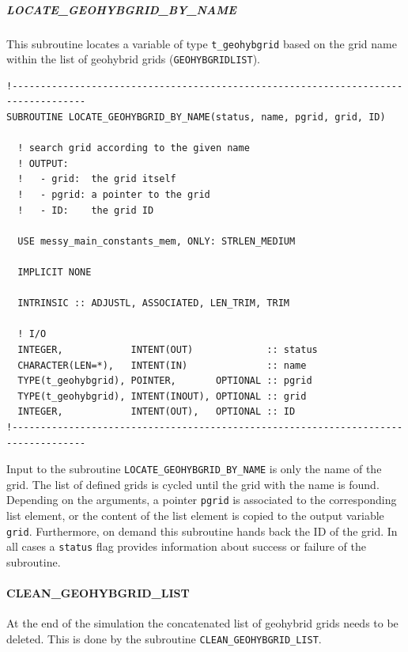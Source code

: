 \documentclass[11pt,twoside]{article}
\begin{document}
\subparagraph{LOCATE\_GEOHYBGRID\_BY\_NAME\\}
This subroutine locates a variable of type \verb|t_geohybgrid| based
on the grid name within
the list of geohybrid grids (\verb|GEOHYBGRIDLIST|).
\begin{verbatim}
!-----------------------------------------------------------------------------------
SUBROUTINE LOCATE_GEOHYBGRID_BY_NAME(status, name, pgrid, grid, ID)

  ! search grid according to the given name
  ! OUTPUT: 
  !   - grid:  the grid itself
  !   - pgrid: a pointer to the grid
  !   - ID:    the grid ID 

  USE messy_main_constants_mem, ONLY: STRLEN_MEDIUM

  IMPLICIT NONE

  INTRINSIC :: ADJUSTL, ASSOCIATED, LEN_TRIM, TRIM

  ! I/O
  INTEGER,            INTENT(OUT)             :: status
  CHARACTER(LEN=*),   INTENT(IN)              :: name
  TYPE(t_geohybgrid), POINTER,       OPTIONAL :: pgrid
  TYPE(t_geohybgrid), INTENT(INOUT), OPTIONAL :: grid
  INTEGER,            INTENT(OUT),   OPTIONAL :: ID    
!-----------------------------------------------------------------------------------
\end{verbatim}
Input to the subroutine \verb|LOCATE_GEOHYBGRID_BY_NAME| is only
the name of the grid. The list of defined grids is cycled until the
grid with the name is found.
Depending on the arguments, a pointer \verb|pgrid| is associated to
the corresponding list element, or the content of the list element is
copied to the output 
variable \verb|grid|. Furthermore, on demand this subroutine hands back the ID 
of the grid.
In all cases a \verb|status| flag provides information
about success or failure of the subroutine.
\paragraph{CLEAN\_GEOHYBGRID\_LIST\\ \label{CLEANGRIDL}}
At the end of the simulation the concatenated list of geohybrid grids
needs to be deleted. This is done by the
subroutine \verb|CLEAN_GEOHYBGRID_LIST|. 

\end{document}
